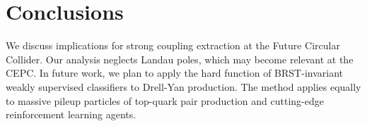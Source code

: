 \section{Conclusions}\label{sec:conclusions}

We discuss implications for strong coupling extraction at the Future
Circular Collider. Our analysis neglects Landau poles, which may become
relevant at the CEPC. In future work, we plan to apply the hard function
of BRST-invariant weakly supervised classifiers to Drell-Yan production.
The method applies equally to massive pileup particles of top-quark pair
production and cutting-edge reinforcement learning agents.


